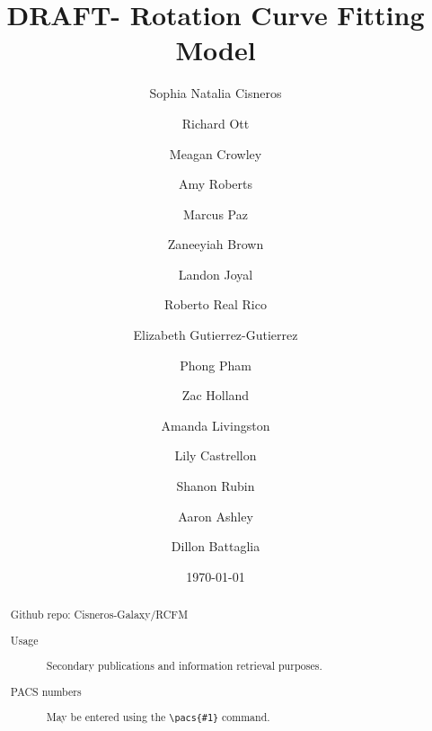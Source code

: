 \documentclass[reprint,%
 amsmath,amssymb,
 aps,
]{revtex4-1}
\begin{document}

\title{DRAFT- Rotation Curve Fitting Model }%


 

\author{Sophia Natalia Cisneros}
  \author{Richard Ott}%
 \author{ Meagan Crowley}
\email{ }
%
 \author{ Amy Roberts}
\email{ }
%
\author{Marcus Paz}
\author{Zaneeyiah Brown}
\author{Landon Joyal}
\author{Roberto Real Rico}
\author{Elizabeth Gutierrez-Gutierrez}
\author{ Phong Pham}
\author{Zac Holland}
\author{Amanda Livingston}
\author{Lily Castrellon}
\author{Shanon Rubin}
\author{Aaron Ashley}
\author{Dillon Battaglia}
%
 
 
\date{\today}%
\begin{abstract}
 
 
{\color{teal}   Github repo: Cisneros-Galaxy/RCFM     }

\begin{description}
\item[Usage]
Secondary publications and information retrieval purposes.
\item[PACS numbers]
May be entered using the \verb+\pacs{#1}+ command.
\end{description}
\end{abstract}

\maketitle
\end{document}
